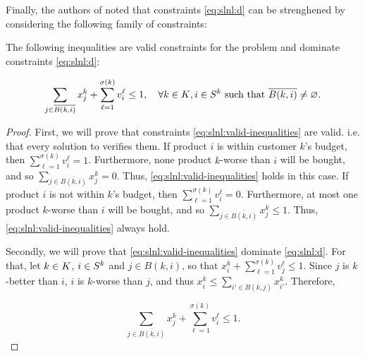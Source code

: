 Finally, the authors of \cite{ca:rpp} noted that constraints \eqref{eq:slnl:d}
can be strenghened by considering the following family of constraints:

\begin{proposition}
    The following inequalities are valid constraints for the problem \slnl and
    dominate constraints \eqref{eq:slnl:d}:

    \begin{equation}
        \sum_{j\in\overline{B(k, i)}} x_j^k
            + \sum_{\ell=1}^{\sigma(k)} v_i^\ell \leq 1
            , \quad \forall {\ensuremath{k \in K}},
                            i \in S^k \text{ such that }
                                \overline{B(k, i)} \neq \varnothing.
        \label{eq:slnl:valid-inequalities}
    \end{equation}
\end{proposition}

\begin{proof}
    First, we will prove that constraints \eqref{eq:slnl:valid-inequalities} are
    valid. i.e. that every solution to \slnl verifies them. If product $i$ is
    within customer $k$'s budget, then $\sum_{\ell=1}^{\sigma(k)} v_i^\ell=1$.
    Furthermore, none product $k$-worse than $i$ will be bought, and so
    $\sum_{j\in \overline{B(k, i)}} x_j^k=0$. Thus,
    \eqref{eq:slnl:valid-inequalities} holds in this case. If product $i$ is not
    within $k$'s budget, then $\sum_{\ell=1}^{\sigma(k)} v_i^\ell=0$.
    Furthermore, at most one product $k$-worse than $i$ will be bought, and so
    $\sum_{j\in \overline{B(k, i)}} x_j^k \leq 1$. Thus,
    \eqref{eq:slnl:valid-inequalities} always hold.

    Secondly, we will prove that \eqref{eq:slnl:valid-inequalities} dominate
    \eqref{eq:slnl:d}. For that, let ${k \in K}$, ${i \in S^k}$ and $j \in B(k, i)$, so that
    $x_i^k + \sum_{\ell=1}^{\sigma(k)}v_j^\ell \leq 1$. Since $j$ is $k$-better
    than $i$, $i$ is $k$-worse than $j$, and thus $x_i^k \leq \sum_{i' \in
    \overline{B(k,j)}} x_{i'}^k$. Therefore,

    \[
        \sum_{j\in\overline{B(k, i)}} x_j^k
            + \sum_{\ell=1}^{\sigma(k)} v_i^\ell \leq 1.
    \]
\end{proof}
